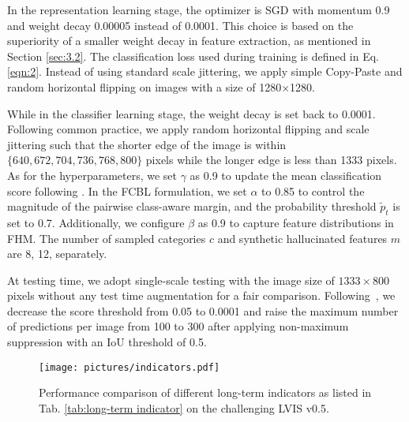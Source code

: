 \documentclass[lettersize,journal]{IEEEtran}
\begin{document}
In the representation learning stage, the optimizer is SGD with momentum 0.9 and weight decay 0.00005 instead of 0.0001.
This choice is based on the superiority of a smaller weight decay in feature extraction, as mentioned in Section \ref{sec:3.2}.
The classification loss used during training is defined in Eq. \eqref{eqn:2}.
Instead of using standard scale jittering, we apply simple Copy-Paste and random horizontal flipping on images with a size of 1280$\times$1280.



While in the classifier learning stage, the weight decay is set back to 0.0001.
Following common practice, we apply random horizontal flipping and scale jittering such that the shorter edge of the image is within $\{640,672,704,736,768,800\}$ pixels while the longer edge is less than 1333 pixels.
As for the hyperparameters, we set $\gamma$ as 0.9 to update the mean classification score following \cite{feng2021exploring}.
In the FCBL formulation, we set $\alpha$ to 0.85 to control the magnitude of the pairwise class-aware margin, and the probability threshold $\tilde{p}_t$ is set to 0.7.
Additionally, we configure $\beta$ as 0.9 to capture feature distributions in FHM. 
The number of sampled categories $c$ and synthetic hallucinated features $m$ are 8, 12, separately.

At testing time, we adopt single-scale testing with the image size of $1333\times800$ pixels without any test time augmentation for a fair comparison.
Following~\cite{gupta2019lvis}, we decrease the score threshold from 0.05 to 0.0001 and raise the maximum number of predictions per image from 100 to 300 after applying non-maximum suppression  with an IoU threshold of 0.5.

\begin{figure}[t]
    \centering
    \texttt{[image: pictures/indicators.pdf]}
    \caption{Performance comparison of different long-term indicators as listed in Tab. \ref{tab:long-term indicator} on the challenging LVIS v0.5.}
    \label{pic:5}
\end{figure}
\end{document}
